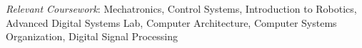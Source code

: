 	{\sl Relevant Coursework}: Mechatronics, Control Systems, Introduction
	to Robotics, Advanced Digital Systems Lab, Computer Architecture,
	Computer Systems Organization, Digital Signal Processing
